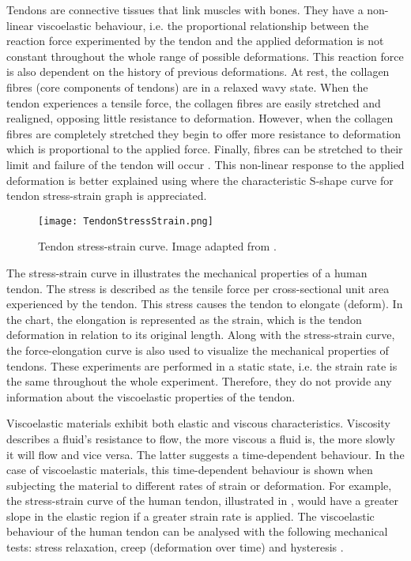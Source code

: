 Tendons are connective tissues that link muscles with bones. They have a non-linear viscoelastic behaviour, i.e. the proportional relationship between the reaction force experimented by the tendon and the applied deformation is not constant throughout the whole range of possible deformations. This reaction force is also dependent on the history of previous deformations. At rest, the collagen fibres (core components of tendons) are in a relaxed wavy state. When the tendon experiences a tensile force, the collagen fibres are easily stretched and realigned, opposing little resistance to deformation. However, when the collagen fibres are completely stretched they begin to offer more resistance to deformation which is proportional to the applied force. Finally, fibres can be stretched to their limit and failure of the tendon will occur \cite{nordin2001basic}. This non-linear response to the applied deformation is better explained using  where the characteristic S-shape curve for tendon stress-strain graph is appreciated.

\begin{figure}[htb!]
    \centering
    \texttt{[image: TendonStressStrain.png]}
    \caption{Tendon stress-strain curve. Image adapted from \cite{maurel1998biomechanical}. }
    \label{fig:tendonSS}
\end{figure}

The stress-strain curve in  illustrates the mechanical properties of a human tendon. The stress is described as the tensile force per cross-sectional unit area experienced by the tendon. This stress causes the tendon to elongate (deform). In the chart, the elongation is represented as the strain, which is the tendon deformation in relation to its original length. Along with the stress-strain curve, the force-elongation curve is also used to visualize the mechanical properties of tendons. These experiments are performed in a static state, i.e. the strain rate is the same throughout the whole experiment. Therefore, they do not provide any information about the viscoelastic properties of the tendon.

Viscoelastic materials exhibit both elastic and viscous characteristics. Viscosity describes a fluid's resistance to flow, the more viscous a fluid is, the more slowly it will flow and vice versa. The latter suggests a time-dependent behaviour. In the case of viscoelastic materials, this time-dependent behaviour is shown when subjecting the material to different rates of strain or deformation. For example, the stress-strain curve of the human tendon, illustrated in , would have a greater slope in the elastic region if a greater strain rate is applied. The viscoelastic behaviour of the human tendon can be analysed with the following mechanical tests: stress relaxation, creep (deformation over time) and hysteresis \cite{nordin2001basic}.

